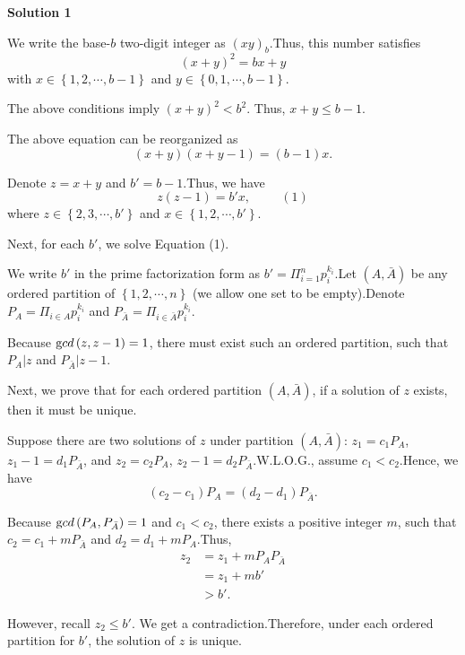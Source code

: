 \begin{enumerate}
\textbf{Solution 1}

We write the base-$b$ two-digit integer as $\left( xy \right)_b$.Thus, this number satisfies
 \[ \left( x + y \right)^2 = b x + y \]with $x \in \left\{ 1, 2, \cdots , b-1 \right\}$ and $y \in \left\{ 0, 1, \cdots , b - 1 \right\}$.

 The above conditions imply $\left( x + y \right)^2 < b^2$. Thus, $x + y \leq b - 1$.

 The above equation can be reorganized as
 \[ \left( x + y \right) \left( x + y - 1 \right) = \left( b - 1 \right) x . \]

 Denote $z = x + y$ and $b' = b - 1$.Thus, we have
 \[ z \left( z - 1 \right) = b' x , \hspace{1cm} (1) \]where $z \in \left\{ 2, 3, \cdots , b' \right\}$ and $x \in \left\{ 1, 2, \cdots , b' \right\}$.

 Next, for each $b'$, we solve Equation (1).

 We write $b'$ in the prime factorization form as $b' = \Pi_{i=1}^n p_i^{k_i}$.Let $\left(A, \bar A \right)$ be any ordered partition of $\left\{ 1, 2, \cdots , n \right\}$ (we allow one set to be empty).Denote $P_A = \Pi_{i \in A} p_i^{k_i}$ and $P_{\bar A} = \Pi_{i \in \bar A} p_i^{k_i}$.

 Because ${\textrm gcd} \left( z, z-1 \right) = 1$, there must exist such an ordered partition, such that $P_A | z$ and $P_{\bar A} | z-1$.

 Next, we prove that for each ordered partition $\left( A, \bar A \right)$, if a solution of $z$ exists, then it must be unique.

 Suppose there are two solutions of $z$ under partition $\left( A, \bar A \right)$: $z_1 = c_1 P_A$, $z_1 - 1 = d_1 P_{\bar A}$, and $z_2 = c_2 P_A$, $z_2 - 1 = d_2 P_{\bar A}$.W.L.O.G., assume $c_1 < c_2$.Hence, we have
 \[ \left( c_2 - c_1 \right) P_A = \left( d_2 - d_1 \right) P_{\bar A} . \]

 Because ${\textrm gcd} \left( P_A, P_{\bar A} \right) = 1$ and $c_1 < c_2$, there exists a positive integer $m$, such that $c_2 = c_1 + m P_{\bar A}$ and $d_2 = d_1 + m P_A$.Thus,\begin{align*}z_2 & = z_1 + m P_A P_{\bar A} \\& = z_1 + m b' \\& > b' .\end{align*}


 However, recall $z_2 \leq b'$. We get a contradiction.Therefore, under each ordered partition for $b'$, the solution of $z$ is unique.


\end{enumerate}
